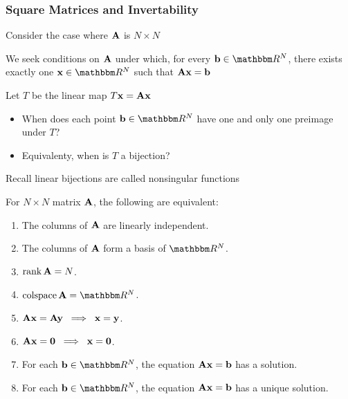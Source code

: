 \begin{frame}\frametitle{Square Matrices and Invertability}

    \vspace{2em}
    Consider the case where $\mathbf A$ is $N \times N$ 
   
   \vspace{.7em}
    We seek conditions on $\mathbf A$ under which, for every $\boldb \in \RR^N$, there
    exists exactly one $\boldx \in \RR^N$ such that $\mathbf A {\mathbf x} = {\mathbf b}$
    
    \vspace{.7em}
    Let $T$ be the linear map $T {\mathbf x} = \mathbf A {\mathbf x}$
    \begin{itemize}
        \item When
        does each point $\boldb \in \RR^N$ have one and only one preimage under $T$?
        \item Equivalenty, when is $T$ a bijection?
    \end{itemize}
    
\end{frame}

\begin{frame}
    
    \vspace{2em}
    Recall linear bijections are called nonsingular functions

    \vspace{.7em}
    \Fact{\eqref{ET-fa:exinv}}
        For $N \times N$ matrix $\mathbf A$, the following are equivalent:
        \begin{enumerate}
            \item The columns of $\mathbf A$ are linearly independent.
            \item The columns of $\mathbf A$ form a basis of $\RR^N$.
            \item $\operatorname{rank} \mathbf A = N$.
            \item $\colspace \boldA = \RR^N$.
            \item $\mathbf A {\mathbf x} = \mathbf A {\mathbf y} \; \implies \; {\mathbf x} = {\mathbf y}$.
            \item $\mathbf A {\mathbf x} = {\mathbf 0} \; \implies \; {\mathbf x} = {\mathbf 0}$.
            \item For each $\boldb \in \RR^N$, the equation $\mathbf A {\mathbf x} = {\mathbf b}$
                has a solution.
            \item For each $\boldb \in \RR^N$, the equation $\mathbf A {\mathbf x} = {\mathbf b}$
                has a unique solution.
        \end{enumerate}

\end{frame}



